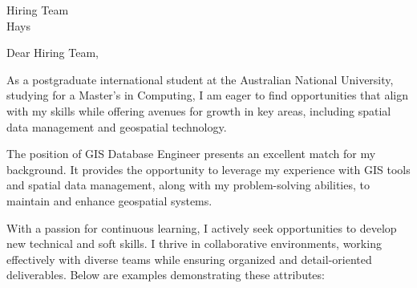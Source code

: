 \documentclass{letter}
\begin{document}
\begin{letter}{Hiring Team\\Hays}
\opening{Dear Hiring Team,}

As a postgraduate international student at the Australian National University, studying for a Master's in Computing, I am eager to find opportunities that align with my skills while offering avenues for growth in key areas, including spatial data management and geospatial technology.

The position of GIS Database Engineer presents an excellent match for my background. It provides the opportunity to leverage my experience with GIS tools and spatial data management, along with my problem-solving abilities, to maintain and enhance geospatial systems.

With a passion for continuous learning, I actively seek opportunities to develop new technical and soft skills. I thrive in collaborative environments, working effectively with diverse teams while ensuring organized and detail-oriented deliverables. Below are examples demonstrating these attributes:
\begin{enumerate}[(a)]
    

\end{enumerate}
\end{letter}
\end{document}
